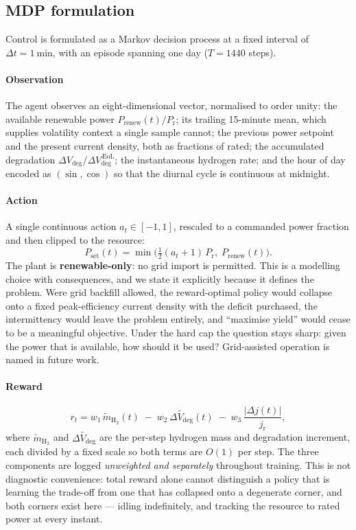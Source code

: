\documentclass[conference]{IEEEtran}
\newcommand{\dVdeg}{\Delta V_{\mathrm{deg}}}
\begin{document}
\subsection{MDP formulation}
Control is formulated as a Markov decision process at a fixed interval of
$\Delta t = \SI{1}{\minute}$, with an episode spanning one day ($T = 1440$ steps).

\paragraph{Observation}
The agent observes an eight-dimensional vector, normalised to order unity: the available
renewable power $P_\mathrm{renew}(t)/P_\mathrm{r}$; its trailing 15-minute mean, which
supplies volatility context a single sample cannot; the previous power setpoint and the
present current density, both as fractions of rated; the accumulated degradation
$\dVdeg/\dVdeg^{\,\mathrm{EoL}}$; the instantaneous hydrogen rate; and the hour of day
encoded as $(\sin, \cos)$ so that the diurnal cycle is continuous at midnight.

\paragraph{Action}
A single continuous action $a_t \in [-1, 1]$, rescaled to a commanded power fraction and
then clipped to the resource:
\begin{equation}
P_\mathrm{set}(t) = \min\!\big(\tfrac{1}{2}(a_t + 1)\,P_\mathrm{r},\;
                               P_\mathrm{renew}(t)\big).
\label{eq:action}
\end{equation}
The plant is \textbf{renewable-only}: no grid import is permitted. This is a modelling
choice with consequences, and we state it explicitly because it defines the problem. Were
grid backfill allowed, the reward-optimal policy would collapse onto a fixed
peak-efficiency current density with the deficit purchased, the intermittency would leave
the problem entirely, and ``maximise yield'' would cease to be a meaningful objective.
Under the hard cap the question stays sharp: given the power that is available, how should
it be used? Grid-assisted operation is named in future work.

\paragraph{Reward}
\begin{equation}
r_t = w_1 \, \tilde m_{\mathrm{H_2}}(t) \;-\; w_2 \, \widetilde{\dVdeg}(t)
      \;-\; w_3 \, \frac{|\Delta j(t)|}{j_\mathrm{r}} ,
\label{eq:reward}
\end{equation}
where $\tilde m_{\mathrm{H_2}}$ and $\widetilde{\dVdeg}$ are the per-step hydrogen mass and
degradation increment, each divided by a fixed scale so both terms are $O(1)$ per step. The
three components are logged \emph{unweighted and separately} throughout training. This is
not diagnostic convenience: total reward alone cannot distinguish a policy that is learning
the trade-off from one that has collapsed onto a degenerate corner, and both corners exist
here --- idling indefinitely, and tracking the resource to rated power at every instant.
\end{document}
